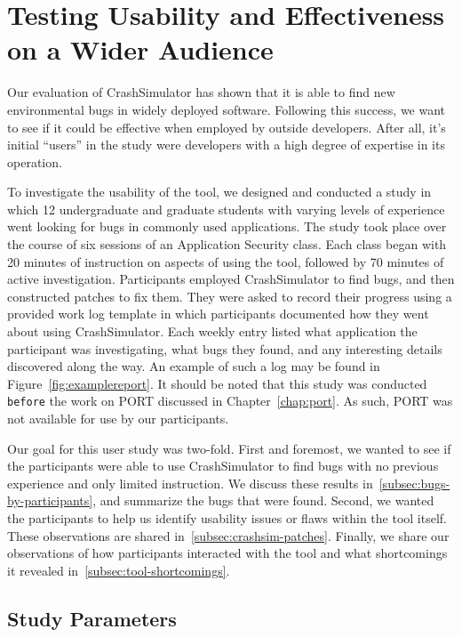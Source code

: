 \chapter{Testing Usability and Effectiveness on a Wider Audience}
\label{chap:userstudy}

Our evaluation of CrashSimulator has shown that it is able to find new environmental bugs in widely deployed software. Following this success, we want to see if it
could be effective when employed by outside developers.
After all, it's initial ``users'' in the study were developers with a high degree of expertise in its operation.

To investigate the usability of the tool,
we designed and conducted a study in which 12 undergraduate and graduate students with varying levels of experience went looking for bugs in commonly used applications.
The study took place over the course of six sessions
of an Application Security class.
Each class began with 20
minutes of instruction on aspects of using the tool, followed by 70 minutes of active investigation. Participants employed
CrashSimulator to find bugs, and then constructed patches to fix
them.
They were asked to record their progress
using a provided work log template in which participants documented
how they went about using CrashSimulator. 
Each weekly entry listed what application the participant was
investigating,  what bugs they found, and any interesting details discovered along the way. An example of such a log may be found in Figure~\ref{fig:examplereport}.
It should be noted that this study was conducted {\tt before} the work on PORT discussed in Chapter~\ref{chap:port}.
As such,
PORT was not available for use by our participants.

Our goal for this user study was two-fold.  First and foremost,
we wanted to see if the participants were able to use CrashSimulator to find bugs with no previous experience and only limited instruction.
We discuss these results in~\ref{subsec:bugs-by-participants}, and summarize the bugs that were found.
Second, we wanted the participants to help us identify usability issues
or flaws within the tool itself. These observations are shared in~\ref{subsec:crashsim-patches}. Finally, we share our observations
of how participants interacted with the tool and what shortcomings
it revealed in~\ref{subsec:tool-shortcomings}.

\section{Study Parameters}
\label{sec:studyparameters}

